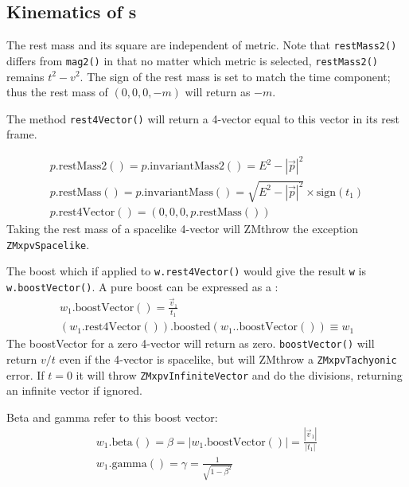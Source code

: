 \subsection{Kinematics of \protect\LV s}

The rest mass and its square are independent of metric.
Note that {\tt restMass2()} differs from {\tt mag2()} in that no matter
which metric is selected, {\tt restMass2()} remains $t^2-v^2$.
The sign of the
rest mass is set to match the time component; thus the rest mass of
$(0,0,0,-m)$ will return as $-m$.

The method {\tt rest4Vector()} will return a 4-vector equal to this vector
in its rest frame.

\begin{eqnarray}
\label{eq:wrestM2}
  p\mbox{.restMass2}() = p\mbox{.invariantMass2}() = E^2 - |\vec{p}|^2 \\
\label{eq:wrestM}
  p\mbox{.restMass}() = p\mbox{.invariantMass}() =
	\sqrt {E^2 - |\vec{p}|^2} \times \mbox{sign}(t_1) \\
\label{eq:wrest4V}
  p\mbox{.rest4Vector}() =  \left( 0, 0, 0, p\mbox{.restMass}() \right)
\end{eqnarray}
\noindent
Taking the rest mass of a spacelike 4-vector will ZMthrow the exception
{\tt ZMxpvSpacelike}.

\noindent
The boost which if applied to {\tt w.rest4Vector()} would give the result
{\tt w} is {\tt w.boostVector()}.  A pure boost can be expressed as a \SV:
\begin{eqnarray}
\label{boostvector}
  w_1\mbox{.boostVector}() =  \frac{\vec{v}_1}{t_1} \\
  \left(w_1\mbox{.rest4Vector}()\right)\mbox{.boosted}
  		\left(w_1.\mbox{.boostVector}() \right) \equiv w_1 \nonumber
\end{eqnarray}
\noindent
The boostVector for a zero 4-vector will return as zero.
{\tt boostVector()}
will return $v/t$ even if the 4-vector is spacelike, but will ZMthrow a
{\tt ZMxpvTachyonic} error.
If $ t=0 $ it will throw {\tt ZMxpvInfiniteVector} and do the divisions,
returning an infinite vector if ignored.

Beta and gamma refer to this boost vector:
\begin{eqnarray}
\label{eq:wbeta}
  w_1\mbox{.beta}() = \beta = \left| w_1\mbox{.boostVector}() \right |
  = \frac{\left| \vec{v}_1 \right|} {| t_1 |} \\
\label{eq:wgamma}
  w_1\mbox{.gamma}() = \gamma = \frac{1}{\sqrt{1-\beta^2}}
\end{eqnarray}

